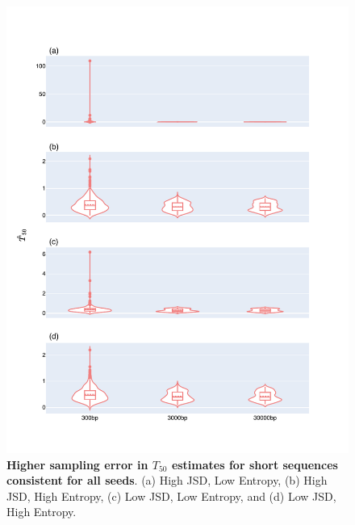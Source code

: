 \begin{figure}[!ht]
\centering
\includegraphics[width=\textwidth]{figures/plots/synthetic/T50/all_seeds.pdf}
\caption[Higher sampling error in $T_{50}$ estimates for short sequences consistent for all seeds]{\textbf{Higher sampling error in $T_{50}$ estimates for short sequences consistent for all seeds}. (a) High JSD, Low Entropy, (b) High JSD, High Entropy, (c)  Low JSD, Low Entropy, and (d) Low JSD, High Entropy.}
\label{fig:synthetic/T50/all-seeds}
\end{figure}